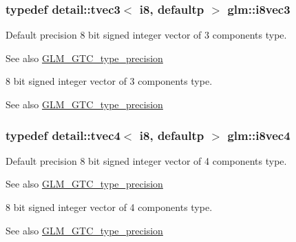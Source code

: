 \subsubsection[{\texorpdfstring{i8vec3}{i8vec3}}]{\setlength{\rightskip}{0pt plus 5cm}typedef detail\+::tvec3$<$ i8, defaultp $>$ {\bf glm\+::i8vec3}}\hypertarget{group__gtc__type__precision_gae1e3127c58fbf1b6fbf28885cfd3dfad}{}\label{group__gtc__type__precision_gae1e3127c58fbf1b6fbf28885cfd3dfad}
Default precision 8 bit signed integer vector of 3 components type. \begin{DoxySeeAlso}{See also}
\hyperlink{group__gtc__type__precision}{G\+L\+M\+\_\+\+G\+T\+C\+\_\+type\+\_\+precision}
\end{DoxySeeAlso}
8 bit signed integer vector of 3 components type. \begin{DoxySeeAlso}{See also}
\hyperlink{group__gtc__type__precision}{G\+L\+M\+\_\+\+G\+T\+C\+\_\+type\+\_\+precision} 
\end{DoxySeeAlso}
\subsubsection[{\texorpdfstring{i8vec4}{i8vec4}}]{\setlength{\rightskip}{0pt plus 5cm}typedef detail\+::tvec4$<$ i8, defaultp $>$ {\bf glm\+::i8vec4}}\hypertarget{group__gtc__type__precision_ga89bb5e6481ae11fb2599b71e36a390bb}{}\label{group__gtc__type__precision_ga89bb5e6481ae11fb2599b71e36a390bb}
Default precision 8 bit signed integer vector of 4 components type. \begin{DoxySeeAlso}{See also}
\hyperlink{group__gtc__type__precision}{G\+L\+M\+\_\+\+G\+T\+C\+\_\+type\+\_\+precision}
\end{DoxySeeAlso}
8 bit signed integer vector of 4 components type. \begin{DoxySeeAlso}{See also}
\hyperlink{group__gtc__type__precision}{G\+L\+M\+\_\+\+G\+T\+C\+\_\+type\+\_\+precision} 
\end{DoxySeeAlso}
